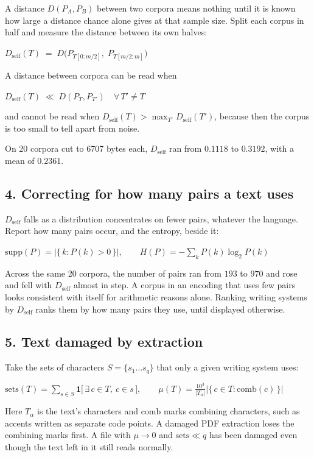 A distance \(D(P_A,P_B)\) between two corpora means nothing until it is known how large a distance chance alone gives at that sample size. Split each corpus in half and measure the distance between its own halves:

\(D_{\text{self}}(T) \;=\; D\bigl(P_{T[0:m/2]},\; P_{T[m/2:m]}\bigr)\)

A distance between corpora can be read when

\(D_{\text{self}}(T) \;\ll\; D(P_T, P_{T'}) \quad \forall\, T' \neq T\)

and cannot be read when \(D_{\text{self}}(T) > \max_{T'} D_{\text{self}}(T')\), because then the corpus is too small to tell apart from noise.

On 20 corpora cut to 6707 bytes each, \(D_{\text{self}}\) ran from \(0.1118\) to \(0.3192\), with a mean of \(0.2361\).

\subsection{4. Correcting for how many pairs a text uses}

\(D_{\text{self}}\) falls as a distribution concentrates on fewer pairs, whatever the language. Report how many pairs occur, and the entropy, beside it:

\(\mathrm{supp}(P) = \bigl|\{\,k : P(k) > 0\,\}\bigr|, \qquad H(P) = -\sum_{k} P(k)\log_2 P(k)\)

Across the same 20 corpora, the number of pairs ran from \(193\) to \(970\) and rose and fell with \(D_{\text{self}}\) almost in step. A corpus in an encoding that uses few pairs looks consistent with itself for arithmetic reasons alone. Ranking writing systems by \(D_{\text{self}}\) ranks them by how many pairs they use, until displayed otherwise.

\subsection{5. Text damaged by extraction}

Take the sets of characters \(S = \{s_1 \dots s_q\}\) that only a given writing system uses:

\(\mathrm{sets}(T) = \sum_{s \in S} \mathbf{1}\bigl[\,\exists\, c \in T,\ c \in s\,\bigr], \qquad \mu(T) = \frac{10^3}{|T_\alpha|}\bigl|\{\,c \in T : \mathrm{comb}(c)\,\}\bigr|\)

Here \(T_\alpha\) is the text's characters and \(\mathrm{comb}\) marks combining characters, such as accents written as separate code points. A damaged PDF extraction loses the combining marks first. A file with \(\mu \to 0\) and \(\mathrm{sets} \ll q\) has been damaged even though the text left in it still reads normally.

